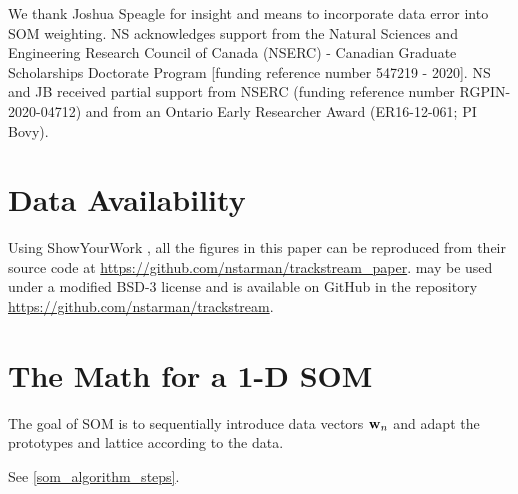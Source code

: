 \documentclass[fleqn,usenatbib]{mnras}
\begin{document}
  We thank Joshua Speagle for insight and means to incorporate data error into
  SOM weighting. NS acknowledges support from the Natural Sciences and
  Engineering Research Council of Canada (NSERC) - Canadian Graduate
  Scholarships Doctorate Program [funding reference number 547219 - 2020]. NS
  and JB  received partial support from NSERC (funding reference number
  RGPIN-2020-04712) and from an Ontario Early Researcher Award (ER16-12-061; PI
  Bovy).





\section*{Data Availability} \label{sec:data_availability}

  Using ShowYourWork \citep{Luger2021}, all the figures in this paper can be
  reproduced from their source code at
  \href{https://github.com/nstarman/trackstream_paper}{https://github.com/nstarman/trackstream\_paper}.
  \trackstream{} may be used under a modified BSD-3 license and is available on
  GitHub in the repository
  \href{https://github.com/nstarman/trackstream}{https://github.com/nstarman/trackstream}.
  









\appendix
\onecolumn


\section{The Math for a 1-D SOM}
\label{app:som_math}

    The goal of SOM is to sequentially introduce data vectors $\mathbf{w}_n$ and
    adapt the prototypes and lattice according to the data.

    See \autoref{som_algorithm_steps}.

    \subsection*{}
\end{document}

